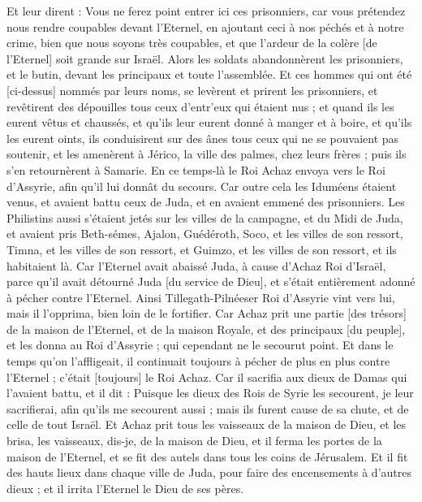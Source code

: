 \begin{multicols}{2}
Et leur dirent : Vous ne ferez point entrer ici ces prisonniers, car vous prétendez nous rendre coupables devant l'Eternel, en ajoutant ceci à nos péchés et à notre crime, bien que nous soyons très coupables, et que l'ardeur de la colère [de l'Eternel] soit grande sur Israël.
Alors les soldats abandonnèrent les prisonniers, et le butin, devant les principaux et toute l'assemblée.
Et ces hommes qui ont été [ci-dessus] nommés par leurs noms, se levèrent et prirent les prisonniers, et revêtirent des dépouilles tous ceux d'entr'eux qui étaient nus ; et quand ils les eurent vêtus et chaussés, et qu'ils leur eurent donné à manger et à boire, et qu'ils les eurent oints, ils conduisirent sur des ânes tous ceux qui ne se pouvaient pas soutenir, et les amenèrent à Jérico, la ville des palmes, chez leurs frères ; puis ils s'en retournèrent à Samarie.
En ce temps-là le Roi Achaz envoya vers le Roi d'Assyrie, afin qu'il lui donnât du secours.
Car outre cela les Iduméens étaient venus, et avaient battu ceux de Juda, et en avaient emmené des prisonniers.
Les Philistins aussi s'étaient jetés sur les villes de la campagne, et du Midi de Juda, et avaient pris Beth-sémes, Ajalon, Guédéroth, Soco, et les villes de son ressort, Timna, et les villes de son ressort, et Guimzo, et les villes de son ressort, et ils habitaient là.
Car l'Eternel avait abaissé Juda, à cause d'Achaz Roi d'Israël, parce qu'il avait détourné Juda [du service de Dieu], et s'était entièrement adonné à pécher contre l'Eternel.
Ainsi Tillegath-Pilnéeser Roi d'Assyrie vint vers lui, mais il l'opprima, bien loin de le fortifier.
Car Achaz prit une partie [des trésors] de la maison de l'Eternel, et de la maison Royale, et des principaux [du peuple], et les donna au Roi d'Assyrie ; qui cependant ne le secourut point.
Et dans le temps qu'on l'affligeait, il continuait toujours à pécher de plus en plus contre l'Eternel ; c'était [toujours] le Roi Achaz.
Car il sacrifia aux dieux de Damas qui l'avaient battu, et il dit : Puisque les dieux des Rois de Syrie les secourent, je leur sacrifierai, afin qu'ils me secourent aussi ; mais ils furent cause de sa chute, et de celle de tout Israël.
Et Achaz prit tous les vaisseaux de la maison de Dieu, et les brisa, les vaisseaux, dis-je, de la maison de Dieu, et il ferma les portes de la maison de l'Eternel, et se fit des autels dans tous les coins de Jérusalem.
Et il fit des hauts lieux dans chaque ville de Juda, pour faire des encensements à d'autres dieux ; et il irrita l'Eternel le Dieu de ses pères.

\end{multicols}
